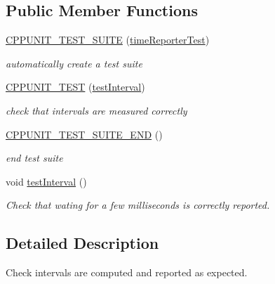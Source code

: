 \subsection*{Public Member Functions}
\begin{DoxyCompactItemize}
\item 
\mbox{\label{classtimeReporterTest_a21439462ca34e21b52c2f535cd30e192}} 
\mbox{\hyperlink{classtimeReporterTest_a21439462ca34e21b52c2f535cd30e192}{C\+P\+P\+U\+N\+I\+T\+\_\+\+T\+E\+S\+T\+\_\+\+S\+U\+I\+TE}} (\mbox{\hyperlink{classtimeReporterTest}{time\+Reporter\+Test}})
\begin{DoxyCompactList}\small\item\em automatically create a test suite \end{DoxyCompactList}\item 
\mbox{\label{classtimeReporterTest_a73cb289025e42913a59225e5b1530119}} 
\mbox{\hyperlink{classtimeReporterTest_a73cb289025e42913a59225e5b1530119}{C\+P\+P\+U\+N\+I\+T\+\_\+\+T\+E\+ST}} (\mbox{\hyperlink{classtimeReporterTest_a4488d70ca37d086b82cce74e5c25a53d}{test\+Interval}})
\begin{DoxyCompactList}\small\item\em check that intervals are measured correctly \end{DoxyCompactList}\item 
\mbox{\label{classtimeReporterTest_a603425c4735cb3300643da88aa75ed3b}} 
\mbox{\hyperlink{classtimeReporterTest_a603425c4735cb3300643da88aa75ed3b}{C\+P\+P\+U\+N\+I\+T\+\_\+\+T\+E\+S\+T\+\_\+\+S\+U\+I\+T\+E\+\_\+\+E\+ND}} ()
\begin{DoxyCompactList}\small\item\em end test suite \end{DoxyCompactList}\item 
void \mbox{\hyperlink{classtimeReporterTest_a4488d70ca37d086b82cce74e5c25a53d}{test\+Interval}} ()
\begin{DoxyCompactList}\small\item\em Check that wating for a few milliseconds is correctly reported. \end{DoxyCompactList}\end{DoxyCompactItemize}


\subsection{Detailed Description}
Check intervals are computed and reported as expected. 

